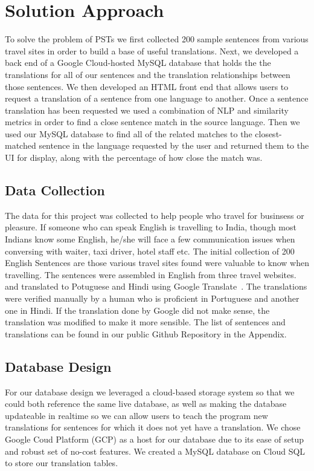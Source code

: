 \documentclass[runningheads]{llncs}
\begin{document}
	\section{Solution Approach}
	To solve the problem of PSTs we first collected 200 sample sentences from various travel sites in order to build a base of useful translations. Next, we developed a back end of a Google Cloud-hosted MySQL database that holds the the translations for all of our sentences and the translation relationships between those sentences. We then developed an HTML front end that allows users to request a translation of a sentence from one language to another. Once a sentence translation has been requested we used a combination of NLP and similarity metrics in order to find a close sentence match in the source language. Then we used our MySQL database to find all of the related matches to the closest-matched sentence in the language requested by the user and returned them to the UI for display, along with the percentage of how close the match was. 

	\subsection{Data Collection}
	The data for this project was collected to help people who travel for businsess or pleasure.  If someone who can speak English is travelling to India, though most Indians know some English, he/she will face a few communication issues when conversing with waiter, taxi driver, hotel staff etc. The initial collection of 200 English Sentences are those various travel sites found were valuable to know when travelling. The sentences were assembled in English from three travel websites.~\cite{ref_url11,ref_url12,ref_url13} and translated to Potuguese and Hindi using Google Translate~\cite{ref_url14}. The translations were verified manually by a human who is proficient in Portuguese and another one in Hindi. If the translation done by Google did not make sense, the translation was modified to make it more sensible. The list of sentences and translations can be found in our public Github Repository in the Appendix.
	

	\subsection{Database Design}
	For our database design we leveraged a cloud-based storage system so that we could both reference the same live database, as well as making the database updateable in realtime so we can allow users to teach the program new translations for sentences for which it does not yet have a translation. We chose Google Coud Platform (GCP) as a host for our database due to its ease of setup and robust set of no-cost features. We created a MySQL database on Cloud SQL to store our translation tables.
	
\end{document}
